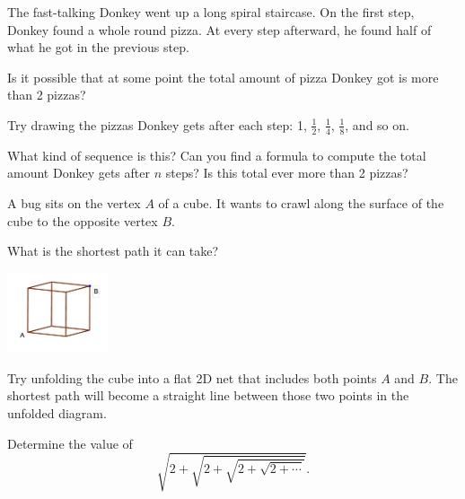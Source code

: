 \documentclass{article}
\begin{document}
\begin{exercise}\label{example:infinite-pizza-staircase}
    The fast-talking Donkey went up a long spiral staircase.  
    On the first step, Donkey found a whole round pizza. At every step afterward, he found half of what he got in the previous step.

    Is it possible that at some point the total amount of pizza Donkey got is more than 2 pizzas?
      
\end{exercise}

\begin{hint*}
    Try drawing the pizzas Donkey gets after each step:  
    1, \( \frac{1}{2} \), \( \frac{1}{4} \), \( \frac{1}{8} \), and so on.  

    What kind of sequence is this? Can you find a formula to compute the total amount Donkey gets after \( n \) steps?  
    Is this total ever more than 2 pizzas?
\end{hint*}

\begin{exercise}\label{example:bug-cube-shortest-path}
    A bug sits on the vertex \( A \) of a cube. It wants to crawl along the surface of the cube to the opposite vertex \( B \).  

    What is the shortest path it can take?
      
\end{exercise}

\begin{center}
    \includegraphics[width=3cm]{./png/cube.png}
\end{center}

\begin{hint*}
    Try unfolding the cube into a flat 2D net that includes both points \( A \) and \( B \). The shortest path will become a straight line between those two points in the unfolded diagram.
\end{hint*}


\begin{exercise}\label{example:infinite-nested-radical}
    Determine the value of 
    \[
        \sqrt{2 + \sqrt{2 + \sqrt{2 + \sqrt{2 + \cdots}}}}.
    \]
     
\end{exercise}
\end{document}

